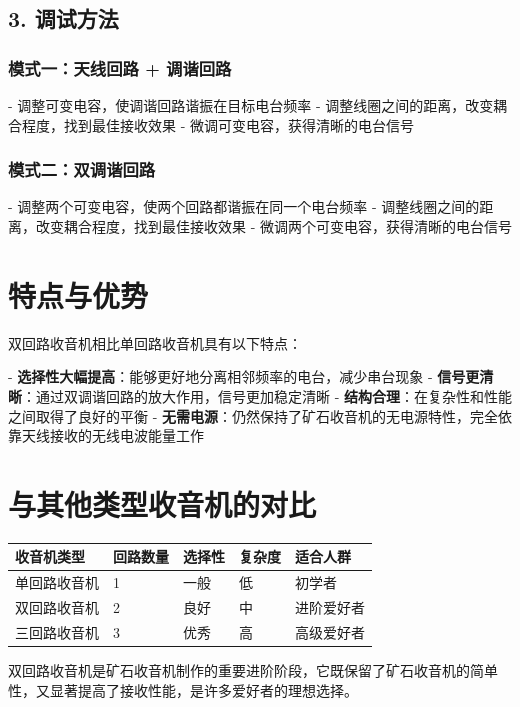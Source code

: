 \documentclass[12pt,UTF8]{ctexbook}
\begin{document}
\subsection{3. 调试方法}

\subsubsection{模式一：天线回路 + 调谐回路}
- 调整可变电容，使调谐回路谐振在目标电台频率
- 调整线圈之间的距离，改变耦合程度，找到最佳接收效果
- 微调可变电容，获得清晰的电台信号

\subsubsection{模式二：双调谐回路}
- 调整两个可变电容，使两个回路都谐振在同一个电台频率
- 调整线圈之间的距离，改变耦合程度，找到最佳接收效果
- 微调两个可变电容，获得清晰的电台信号

\section{特点与优势}

双回路收音机相比单回路收音机具有以下特点：

- \textbf{选择性大幅提高}：能够更好地分离相邻频率的电台，减少串台现象
- \textbf{信号更清晰}：通过双调谐回路的放大作用，信号更加稳定清晰
- \textbf{结构合理}：在复杂性和性能之间取得了良好的平衡
- \textbf{无需电源}：仍然保持了矿石收音机的无电源特性，完全依靠天线接收的无线电波能量工作

\section{与其他类型收音机的对比}

\begin{tabular}{|l|l|l|l|l|}
	\hline
	\textbf{收音机类型} & \textbf{回路数量} & \textbf{选择性} & \textbf{复杂度} & \textbf{适合人群} \\
	\hline
	单回路收音机 & 1 & 一般 & 低 & 初学者 \\
	\hline
	双回路收音机 & 2 & 良好 & 中 & 进阶爱好者 \\
	\hline
	三回路收音机 & 3 & 优秀 & 高 & 高级爱好者 \\
	\hline
\end{tabular}

双回路收音机是矿石收音机制作的重要进阶阶段，它既保留了矿石收音机的简单性，又显著提高了接收性能，是许多爱好者的理想选择。
\end{document}
